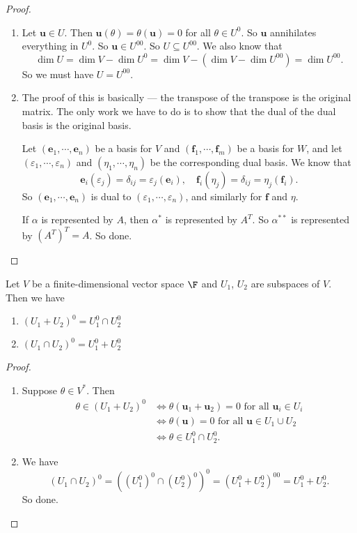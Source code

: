 \documentclass[a4paper]{article}
\begin{document}
\begin{proof}\leavevmode
  \begin{enumerate}
    \item Let $\mathbf{u} \in U$. Then $\mathbf{u}(\theta) = \theta(\mathbf{u}) = 0$ for all $\theta \in U^0$. So $\mathbf{u}$ annihilates everything in $U^0$. So $\mathbf{u} \in U^{00}$. So $U \subseteq U^{00}$. We also know that
      \[
        \dim U = \dim V - \dim U^0 = \dim V - (\dim V - \dim U^{00}) = \dim U^{00}.
      \]
      So we must have $U = U^{00}$.
    \item The proof of this is basically --- the transpose of the transpose is the original matrix. The only work we have to do is to show that the dual of the dual basis is the original basis.

      Let $(\mathbf{e}_1, \cdots, \mathbf{e}_n)$ be a basis for $V$ and $(\mathbf{f}_1, \cdots, \mathbf{f}_m)$ be a basis for $W$, and let $(\varepsilon_1, \cdots, \varepsilon_n)$ and $(\eta_1, \cdots, \eta_n)$ be the corresponding dual basis. We know that
      \[
        \mathbf{e}_i(\varepsilon_j) = \delta_{ij} = \varepsilon_j(\mathbf{e}_i),\quad \mathbf{f}_i(\eta_j) = \delta_{ij} = \eta_j(\mathbf{f}_i).
      \]
      So $(\mathbf{e}_1, \cdots, \mathbf{e}_n)$ is dual to $(\varepsilon_1, \cdots, \varepsilon_n)$, and similarly for $\mathbf{f}$ and $\eta$.

      If $\alpha$ is represented by $A$, then $\alpha^*$ is represented by $A^T$. So $\alpha^{**}$ is represented by $(A^T)^T = A$. So done.
  \end{enumerate}
\end{proof}

\begin{prop}
  Let $V$ be a finite-dimensional vector space $\F$ and $U_1$, $U_2$ are subspaces of $V$. Then we have
  \begin{enumerate}
    \item $(U_1 + U_2)^0 = U_1^0 \cap U_2^0$
    \item $(U_1 \cap U_2)^0 = U_1^0 + U_2^0$
  \end{enumerate}
\end{prop}

\begin{proof}\leavevmode
  \begin{enumerate}
    \item Suppose $\theta \in V^*$. Then
      \begin{align*}
        \theta \in (U_1 + U_2)^0 &\Leftrightarrow \theta (\mathbf{u}_1 + \mathbf{u}_2) = 0\text{ for all }\mathbf{u}_i \in U_i\\
        &\Leftrightarrow \theta (\mathbf{u}) = 0\text{ for all }\mathbf{u} \in U_1 \cup U_2\\
        &\Leftrightarrow \theta \in U_1^0 \cap U_2^0.
      \end{align*}
    \item We have
      \[
        (U_1 \cap U_2)^0 = ((U_1^0)^0 \cap (U_2^0)^0)^0 = (U_1^0 + U_2^0)^{00} = U_1^0 + U_2^0.
      \]
      So done.
  \end{enumerate}
\end{proof}
\end{document}
